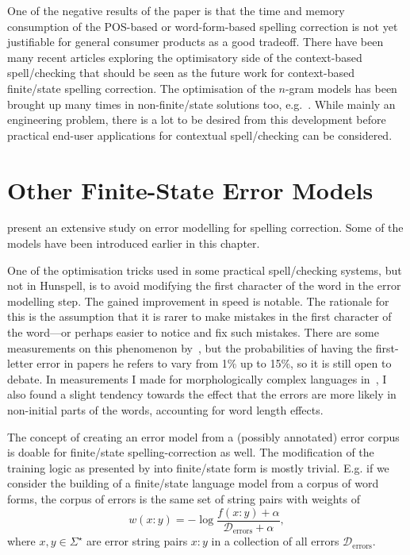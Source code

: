 \documentclass[officiallayout,final]{unihelcompling}
\begin{document}
One of the negative results of the paper is that the time and memory
consumption of the POS-based or word-form-based spelling correction is not yet
justifiable for general consumer products as a good tradeoff. There have been
many recent articles exploring the optimisatory side of the context-based
spell\-/checking that should be seen as the future work for context-based
finite\-/state spelling correction. The optimisation of the \(n\)-gram models
has been brought up many times in non-finite\-/state solutions too,
e.g.~\citet{church2007compressing}. While mainly an engineering problem, there
is a lot to be desired from this development before practical end-user
applications for contextual spell\-/checking can be considered.

\section{Other Finite-State Error Models}
\label{sec:other-errors}

\citet{deorowicz2005correcting} present an extensive study on error
modelling for spelling correction. Some of the models have been
introduced earlier in this chapter.

One of the optimisation tricks used in some practical spell\-/checking systems,
but not in Hunspell, is to avoid modifying the first character of the word in
the error modelling step. The gained improvement in speed is notable. The
rationale for this is the assumption that it is rarer to make mistakes in the
first character of the word---or perhaps easier to notice and fix such
mistakes. There are some measurements on this phenomenon
by~\citet{bhagat2007spelling}, but the probabilities of having the first-letter
error in papers he refers to vary from 1\% up to 15\%, so it is still open to
debate. In measurements I made for morphologically complex languages
in~, I also found a slight tendency towards
the effect that the errors are more likely in non-initial parts of the words,
accounting for word length effects.

The concept of creating an error model from a (possibly annotated) error corpus
is doable for finite\-/state spelling-correction as well. The modification of
the training logic as presented by \citep{church1991probability} into
finite\-/state form is mostly trivial. E.g. if we consider the building of a
finite\-/state language model from a corpus of word forms, the corpus of errors
is the same set of string pairs with weights of 
\begin{equation}
    w(x:y) = -\log\frac{f(x:y) + \alpha}{\mathcal{D}_\mathrm{errors} + \alpha},
\end{equation}
where $x, y \in \Sigma^\star$ are error string pairs $x:y$ in a collection
of all errors $\mathcal{D}_\mathrm{errors}$.
\end{document}
